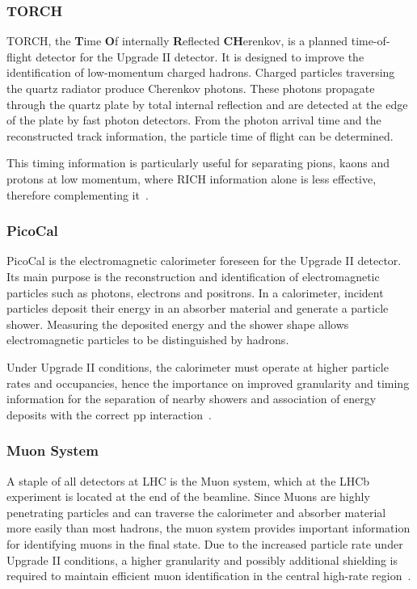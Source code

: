 \subsubsection{TORCH}
TORCH, the \textbf{T}ime \textbf{O}f internally \textbf{R}eflected \textbf{CH}erenkov, is a planned time-of-flight detector for the Upgrade II detector. It is designed to improve the identification of low-momentum charged hadrons. Charged particles traversing the quartz radiator produce Cherenkov photons. These photons propagate through the quartz plate by total internal reflection and are detected at the edge of the plate by fast photon detectors. From the photon arrival time and the reconstructed track information, the particle time of flight can be determined.\par
This timing information is particularly useful for separating pions, kaons and protons at low momentum, where RICH information alone is less effective, therefore complementing it~\cite{CERN-LHCC-2021-012}.
%
\subsubsection{PicoCal}
PicoCal is the electromagnetic calorimeter foreseen for the Upgrade II detector. Its main purpose is the reconstruction and identification of electromagnetic particles such as photons, electrons and positrons. In a calorimeter, incident particles deposit their energy in an absorber material and generate a particle shower. Measuring the deposited energy and the shower shape allows electromagnetic particles to be distinguished by hadrons.\par
Under Upgrade II conditions, the calorimeter must operate at higher particle rates and occupancies, hence the importance on improved granularity and timing information for the separation of nearby showers and association of energy deposits with the correct pp interaction~\cite{CERN-LHCC-2021-012}.
%
\subsubsection{Muon System}
A staple of all detectors at LHC is the Muon system, which at the LHCb experiment is located at the end of the beamline. Since Muons are highly penetrating particles and can traverse the calorimeter and absorber material more easily than most hadrons, the muon system provides important information for identifying muons in the final state. Due to the increased particle rate under Upgrade II conditions, a higher granularity and possibly additional shielding is required to maintain efficient muon identification in the central high-rate region~\cite{CERN-LHCC-2021-012}.
%
%
